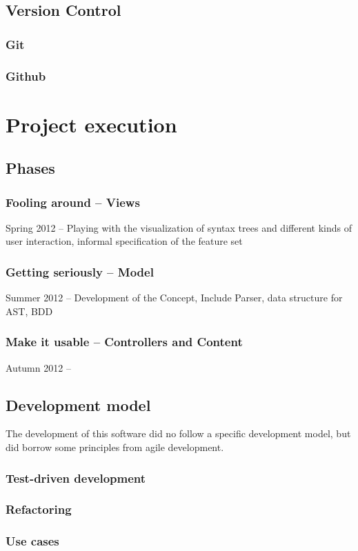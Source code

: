 \subsection{Version Control}

\subsubsection{Git}

\subsubsection{Github}

\section{Project execution}

\subsection{Phases}

\subsubsection{Fooling around – Views}

Spring 2012 – Playing with the visualization of syntax trees and different kinds of user interaction, informal specification of the feature set

\subsubsection{Getting seriously – Model}

Summer 2012 – Development of the Concept, Include Parser, data structure for AST, BDD

\subsubsection{Make it usable – Controllers and Content}

Autumn 2012 – 

\subsection{Development model}

The development of this software did no follow a specific development model, 
but did borrow some principles from agile development.

\subsubsection{Test-driven development}

\subsubsection{Refactoring}

\subsubsection{Use cases}
